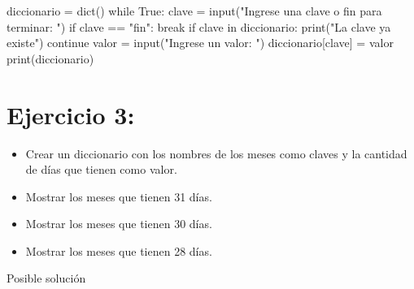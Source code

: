 \documentclass[
  a4paper,
  DIV=11,
  numbers=noendperiod,
  onepage,
  openany]{scrreprt}
\newenvironment{Shaded}{\begin{snugshade}}{\end{snugshade}}
\newcommand{\BuiltInTok}[1]{\textcolor[rgb]{0.00,0.23,0.31}{#1}}
\newcommand{\ControlFlowTok}[1]{\textcolor[rgb]{0.00,0.23,0.31}{#1}}
\newcommand{\KeywordTok}[1]{\textcolor[rgb]{0.00,0.23,0.31}{#1}}
\newcommand{\NormalTok}[1]{\textcolor[rgb]{0.00,0.23,0.31}{#1}}
\newcommand{\OperatorTok}[1]{\textcolor[rgb]{0.37,0.37,0.37}{#1}}
\newcommand{\StringTok}[1]{\textcolor[rgb]{0.13,0.47,0.30}{#1}}
\newcommand{\VariableTok}[1]{\textcolor[rgb]{0.07,0.07,0.07}{#1}}
\providecommand{\tightlist}{%
  \setlength{\itemsep}{0pt}\setlength{\parskip}{0pt}}\usepackage{longtable,booktabs,array}
\begin{document}
\begin{Shaded}
\begin{Highlighting}[]
\NormalTok{diccionario }\OperatorTok{=} \BuiltInTok{dict}\NormalTok{()}
\ControlFlowTok{while} \VariableTok{True}\NormalTok{:}
\NormalTok{    clave }\OperatorTok{=} \BuiltInTok{input}\NormalTok{(}\StringTok{"Ingrese una clave o \textquotesingle{}fin\textquotesingle{} para terminar: "}\NormalTok{)}
    \ControlFlowTok{if}\NormalTok{ clave }\OperatorTok{==} \StringTok{"fin"}\NormalTok{:}
        \ControlFlowTok{break}
    \ControlFlowTok{if}\NormalTok{ clave }\KeywordTok{in}\NormalTok{ diccionario:}
        \BuiltInTok{print}\NormalTok{(}\StringTok{"La clave ya existe"}\NormalTok{)}
        \ControlFlowTok{continue}
\NormalTok{    valor }\OperatorTok{=} \BuiltInTok{input}\NormalTok{(}\StringTok{"Ingrese un valor: "}\NormalTok{)}
\NormalTok{    diccionario[clave] }\OperatorTok{=}\NormalTok{ valor}
\BuiltInTok{print}\NormalTok{(diccionario)}
\end{Highlighting}
\end{Shaded}

\section{Ejercicio 3:}\label{ejercicio-3-4}

\begin{itemize}
\tightlist
\item
  Crear un diccionario con los nombres de los meses como claves y la
  cantidad de días que tienen como valor.
\item
  Mostrar los meses que tienen 31 días.
\item
  Mostrar los meses que tienen 30 días.
\item
  Mostrar los meses que tienen 28 días.
\end{itemize}

Posible solución
\end{document}
